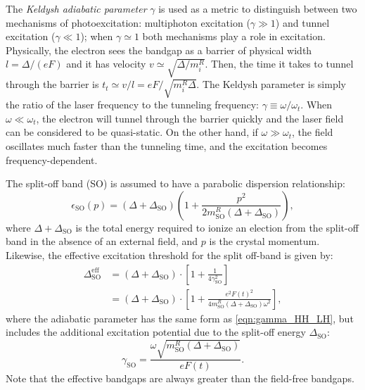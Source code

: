 The \textit{Keldysh adiabatic parameter} $\gamma$ is used as a metric to distinguish between two mechanisms of photoexcitation: multiphoton excitation ($\gamma \gg 1$) and tunnel excitation ($\gamma \ll 1$); when $\gamma \simeq 1$ both mechanisms play a role in excitation. Physically, the electron sees the bandgap as a barrier of physical width $l = \Delta / (e F)$ and it has velocity $v \simeq \sqrt{\Delta / m_i^R}$. Then, the time it takes to tunnel through the barrier is $t_t \simeq v/l = eF / \sqrt{m_i^R \Delta}$. The Keldysh parameter is simply the ratio of the laser frequency to the tunneling frequency: $\gamma \equiv \omega / \omega_t$. When $\omega \ll \omega_t$, the electron will tunnel through the barrier quickly and the laser field can be considered to be quasi-static. On the other hand, if $\omega \gg \omega_t$, the field oscillates much faster than the tunneling time, and the excitation becomes frequency-dependent.

The split-off band (SO) is assumed to have a parabolic dispersion relationship:
\begin{equation}
	\epsilon_{\textrm{SO}}(p) = (\Delta+\Delta_{\textrm{SO}}) \left( 1 + \frac{p^2}{2 m_{\textrm{SO}}^R (\Delta+\Delta_{\textrm{SO}})}  \right),
\end{equation}
where $\Delta + \Delta_{\textrm{SO}}$ is the total energy required to ionize an election from the split-off band in the absence of an external field, and $p$ is the crystal momentum. Likewise, the effective excitation threshold for the split off-band is given by:
\begin{equation}
	\begin{aligned}
		\Delta_{\textrm{SO}}^{\textrm{eff}} &= (\Delta + \Delta_{\textrm{SO}}) \cdot \left[ 1 + \frac{1}{4 \gamma^2_{\textrm{SO}}} \right] \\
		&= (\Delta + \Delta_{\textrm{SO}}) \cdot \left[1 + \frac{e^2 F(t)^2}{4 m_{\textrm{SO}}^R (\Delta + \Delta_{\textrm{SO}}) \omega^2} \right],
	\end{aligned}
	\label{eqn:eff_bandgap_SO}
\end{equation}
where the adiabatic parameter has the same form as \cref{eqn:gamma_HH_LH}, but includes the additional excitation potential due to the split-off energy $\Delta_{\textrm{SO}}$:
\begin{equation}
	\label{eqn:gamma_SO}
	\gamma_{\textrm{SO}} = \frac{\omega \sqrt{m_{\textrm{SO}}^R (\Delta + \Delta_{\textrm{SO}})}}{e F(t)}.
\end{equation}
Note that the effective bandgaps are always greater than the field-free bandgaps.

